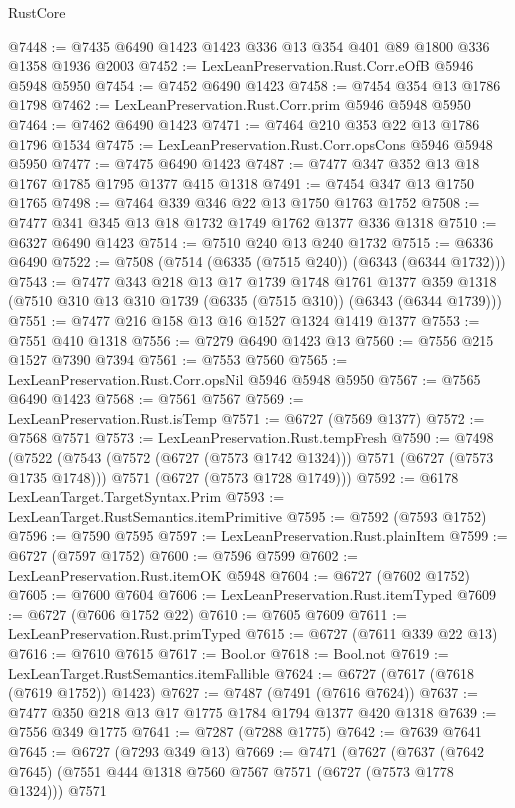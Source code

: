 \begin{lexlean}{RustCore}
\begin{coremodule}
@7448 := @7435 @6490 @1423 @1423 @336 @13 @354 @401 @89 @1800 @336 @1358 @1936 @2003
@7452 := LexLeanPreservation.Rust.Corr.eOfB @5946 @5948 @5950
@7454 := @7452 @6490 @1423
@7458 := @7454 @354 @13 @1786 @1798
@7462 := LexLeanPreservation.Rust.Corr.prim @5946 @5948 @5950
@7464 := @7462 @6490 @1423
@7471 := @7464 @210 @353 @22 @13 @1786 @1796 @1534
@7475 := LexLeanPreservation.Rust.Corr.opsCons @5946 @5948 @5950
@7477 := @7475 @6490 @1423
@7487 := @7477 @347 @352 @13 @18 @1767 @1785 @1795 @1377 @415 @1318
@7491 := @7454 @347 @13 @1750 @1765
@7498 := @7464 @339 @346 @22 @13 @1750 @1763 @1752
@7508 := @7477 @341 @345 @13 @18 @1732 @1749 @1762 @1377 @336 @1318
@7510 := @6327 @6490 @1423
@7514 := @7510 @240 @13 @240 @1732
@7515 := @6336 @6490
@7522 := @7508 (@7514 (@6335 (@7515 @240)) (@6343 (@6344 @1732)))
@7543 := @7477
    @343
    @218
    @13
    @17
    @1739
    @1748
    @1761
    @1377
    @359
    @1318
    (@7510 @310 @13 @310 @1739 (@6335 (@7515 @310)) (@6343 (@6344 @1739)))
@7551 := @7477 @216 @158 @13 @16 @1527 @1324 @1419 @1377
@7553 := @7551 @410 @1318
@7556 := @7279 @6490 @1423 @13
@7560 := @7556 @215 @1527 @7390 @7394
@7561 := @7553 @7560
@7565 := LexLeanPreservation.Rust.Corr.opsNil @5946 @5948 @5950
@7567 := @7565 @6490 @1423
@7568 := @7561 @7567
@7569 := LexLeanPreservation.Rust.isTemp
@7571 := @6727 (@7569 @1377)
@7572 := @7568 @7571
@7573 := LexLeanPreservation.Rust.tempFresh
@7590 := @7498
    (@7522
      (@7543 (@7572 (@6727 (@7573 @1742 @1324))) @7571 (@6727 (@7573 @1735 @1748)))
      @7571
      (@6727 (@7573 @1728 @1749)))
@7592 := @6178 LexLeanTarget.TargetSyntax.Prim
@7593 := LexLeanTarget.RustSemantics.itemPrimitive
@7595 := @7592 (@7593 @1752)
@7596 := @7590 @7595
@7597 := LexLeanPreservation.Rust.plainItem
@7599 := @6727 (@7597 @1752)
@7600 := @7596 @7599
@7602 := LexLeanPreservation.Rust.itemOK @5948
@7604 := @6727 (@7602 @1752)
@7605 := @7600 @7604
@7606 := LexLeanPreservation.Rust.itemTyped
@7609 := @6727 (@7606 @1752 @22)
@7610 := @7605 @7609
@7611 := LexLeanPreservation.Rust.primTyped
@7615 := @6727 (@7611 @339 @22 @13)
@7616 := @7610 @7615
@7617 := Bool.or
@7618 := Bool.not
@7619 := LexLeanTarget.RustSemantics.itemFallible
@7624 := @6727 (@7617 (@7618 (@7619 @1752)) @1423)
@7627 := @7487 (@7491 (@7616 @7624))
@7637 := @7477 @350 @218 @13 @17 @1775 @1784 @1794 @1377 @420 @1318
@7639 := @7556 @349 @1775
@7641 := @7287 (@7288 @1775)
@7642 := @7639 @7641
@7645 := @6727 (@7293 @349 @13)
@7669 := @7471
    (@7627
      (@7637
        (@7642 @7645)
        (@7551 @444 @1318 @7560 @7567 @7571 (@6727 (@7573 @1778 @1324)))
        @7571

\end{coremodule}
\end{lexlean}
